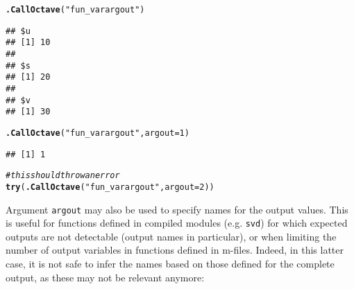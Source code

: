 \documentclass[english,10pt,a4paper]{article}\usepackage[]{graphicx}\usepackage[]{color}
\makeatletter
\newcommand{\hlnum}[1]{\textcolor[rgb]{0.686,0.059,0.569}{#1}}%
\newcommand{\hlstr}[1]{\textcolor[rgb]{0.192,0.494,0.8}{#1}}%
\newcommand{\hlcom}[1]{\textcolor[rgb]{0.678,0.584,0.686}{\textit{#1}}}%
\newcommand{\hlstd}[1]{\textcolor[rgb]{0.345,0.345,0.345}{#1}}%
\newcommand{\hlkwc}[1]{\textcolor[rgb]{0.333,0.667,0.333}{#1}}%
\newcommand{\hlkwd}[1]{\textcolor[rgb]{0.737,0.353,0.396}{\textbf{#1}}}%
\newenvironment{kframe}{%
 \def\at@end@of@kframe{}%
 \ifinner\ifhmode%
  \def\at@end@of@kframe{\end{minipage}}%
  \begin{minipage}{\columnwidth}%
 \fi\fi%
 \def\FrameCommand##1{\hskip\@totalleftmargin \hskip-\fboxsep
 \colorbox{shadecolor}{##1}\hskip-\fboxsep
     \hskip-\linewidth \hskip-\@totalleftmargin \hskip\columnwidth}%
 \MakeFramed {\advance\hsize-\width
   \@totalleftmargin\z@ \linewidth\hsize
   \@setminipage}}%
 {\par\unskip\endMakeFramed%
 \at@end@of@kframe}
\newenvironment{knitrout}{}{} %
\let\code=\texttt
\makeatother
\begin{document}
\begin{knitrout}
\color{fgcolor}\begin{kframe}
\begin{alltt}
\hlkwd{.CallOctave}\hlstd{(}\hlstr{"fun_varargout"}\hlstd{)}
\end{alltt}
\begin{verbatim}
## $u
## [1] 10
## 
## $s
## [1] 20
## 
## $v
## [1] 30
\end{verbatim}
\begin{alltt}
\hlkwd{.CallOctave}\hlstd{(}\hlstr{"fun_varargout"}\hlstd{,} \hlkwc{argout} \hlstd{=} \hlnum{1}\hlstd{)}
\end{alltt}
\begin{verbatim}
## [1] 1
\end{verbatim}
\begin{alltt}
\hlcom{# this should throw an error}
\hlkwd{try}\hlstd{(}\hlkwd{.CallOctave}\hlstd{(}\hlstr{"fun_varargout"}\hlstd{,} \hlkwc{argout} \hlstd{=} \hlnum{2}\hlstd{))}
\end{alltt}


{\ttfamily\noindent\bfseries\color{errorcolor}{\#\# Error: RcppOctave - error in Octave function `fun\_varargout`:\\\#\#\ \  usage: Expecting 1 or 3 output variables.\\\#\# error:\ \  fun\_varargout at line 34, column 7}}\end{kframe}
\end{knitrout}


Argument \code{argout} may also be used to specify names for the output values.
This is useful for functions defined in compiled modules (e.g. \code{svd}) for
which expected outputs are not detectable (output names in particular), or when
limiting the number of output variables in functions defined in m-files.
Indeed, in this latter case, it is not safe to infer the names based on those
defined for the complete output, as these may not be relevant anymore:
\end{document}

